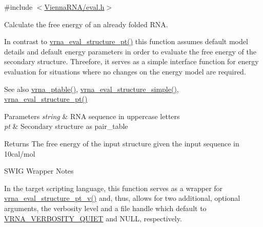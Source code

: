 {\ttfamily \#include $<$\mbox{\hyperlink{eval_8h}{Vienna\+R\+N\+A/eval.\+h}}$>$}



Calculate the free energy of an already folded R\+NA. 

In contrast to \mbox{\hyperlink{group__eval_gadbd09372ddfd7a450bbd590c96a6bfe4}{vrna\+\_\+eval\+\_\+structure\+\_\+pt()}} this function assumes default model details and default energy parameters in order to evaluate the free energy of the secondary structure. Threefore, it serves as a simple interface function for energy evaluation for situations where no changes on the energy model are required.

\begin{DoxySeeAlso}{See also}
\mbox{\hyperlink{group__struct__utils__pair__table_gae829fb8bb7f694c12a9c0bbc34c77c60}{vrna\+\_\+ptable()}}, \mbox{\hyperlink{group__eval_ga7e5273464b775d4130245681312c1369}{vrna\+\_\+eval\+\_\+structure\+\_\+simple()}}, \mbox{\hyperlink{group__eval_gadbd09372ddfd7a450bbd590c96a6bfe4}{vrna\+\_\+eval\+\_\+structure\+\_\+pt()}}
\end{DoxySeeAlso}

\begin{DoxyParams}{Parameters}
{\em string} & R\+NA sequence in uppercase letters \\
\hline
{\em pt} & Secondary structure as pair\+\_\+table \\
\hline
\end{DoxyParams}
\begin{DoxyReturn}{Returns}
The free energy of the input structure given the input sequence in 10cal/mol
\end{DoxyReturn}
\begin{DoxyRefDesc}{S\+W\+I\+G Wrapper Notes}
\item[\mbox{\hyperlink{wrappers__wrappers000071}{S\+W\+I\+G Wrapper Notes}}]In the target scripting language, this function serves as a wrapper for \mbox{\hyperlink{group__eval_ga2c6533ba0afe4c88d335d8f1e0e2a48e}{vrna\+\_\+eval\+\_\+structure\+\_\+pt\+\_\+v()}} and, thus, allows for two additional, optional arguments, the verbosity level and a file handle which default to \mbox{\hyperlink{group__eval_gaf4afe19780b61b4962c613bde324128b}{V\+R\+N\+A\+\_\+\+V\+E\+R\+B\+O\+S\+I\+T\+Y\+\_\+\+Q\+U\+I\+ET}} and N\+U\+LL, respectively. \end{DoxyRefDesc}
\mbox{\label{group__eval_ga76e152ee9a02be23da14cdddf52b4e44}} 
